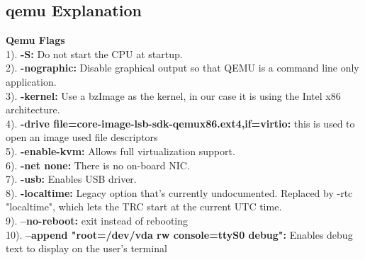 \documentclass[letterpaper,10pt]{article}
\begin{document}
\subsection{qemu Explanation}
{\bfseries Qemu Flags}\\
1). {\textbf{-S:}} Do not start the CPU at startup.\\
2). {\textbf{-nographic:}} Disable graphical output so that QEMU is a command line only application.\\
3). {\textbf{-kernel:}} Use a bzImage as the kernel, in our case it is using the Intel x86 architecture.\\
4). {\textbf{-drive file=core-image-lsb-sdk-qemux86.ext4,if=virtio:}} this is used to open an image used file descriptors\\
5). {\textbf{-enable-kvm:}} Allows full virtualization support.\\
6). {\textbf{-net none:}} There is no on-board NIC.\\
7). {\textbf{-usb:}} Enables USB driver.\\
8). {\textbf{-localtime:}} Legacy option that's currently undocumented. Replaced by -rtc "localtime", which lets the TRC start at the current UTC time.\\
9). {\textbf{--no-reboot:}} exit instead of rebooting\\
10). {\textbf{--append "root=/dev/vda rw console=ttyS0 debug":}} Enables debug text to display on the user's terminal\\\\

\end{document}
